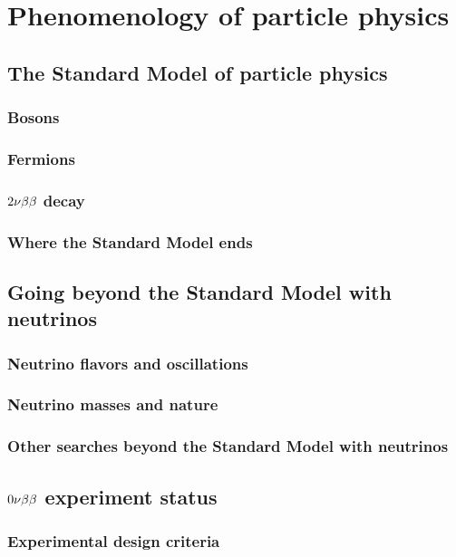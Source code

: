 \chapter{Phenomenology of particle physics}
\section{The Standard Model of particle physics}
\subsection{Bosons}
\subsection{Fermions}
\subsection{$2\nu\beta\beta$ decay}
\subsection{Where the Standard Model ends}
\section{Going beyond the Standard Model with neutrinos}
\subsection{Neutrino flavors and oscillations}
\subsection{Neutrino masses and nature}
\label{subsec:nu_mass_nature}
\subsection{Other searches beyond the Standard Model with neutrinos}


\section{$0\nu\beta\beta$ experiment status}
\subsection{Experimental design criteria}

